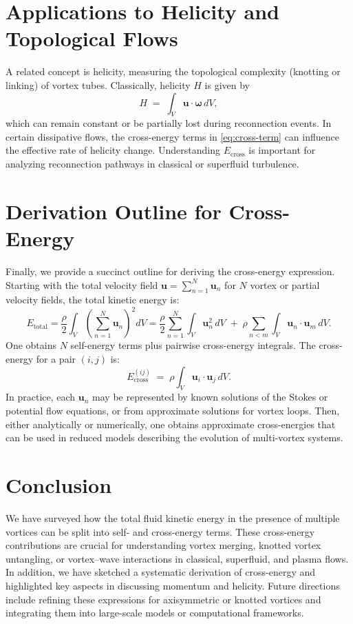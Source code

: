 \documentclass[11pt]{article}
\begin{document}
\section{Applications to Helicity and Topological Flows}
\label{sec:helicity}
A related concept is helicity, measuring the topological complexity (knotting or
linking) of vortex tubes. Classically, helicity $H$ is given by
\begin{equation}
   H \;=\; \int_V \mathbf{u} \cdot \boldsymbol{\omega}\, dV,
\end{equation}
which can remain constant or be partially lost during reconnection events. In certain
dissipative flows, the cross-energy terms in \eqref{eq:cross-term} can influence
the effective rate of helicity change. Understanding $E_{\text{cross}}$ is important
for analyzing reconnection pathways in classical or superfluid turbulence.

\section{Derivation Outline for Cross-Energy}
\label{sec:derivation}
Finally, we provide a succinct outline for deriving the cross-energy expression.
Starting with the total velocity field $\mathbf{u} = \sum_{n=1}^N \mathbf{u}_n$
for $N$ vortex or partial velocity fields, the total kinetic energy is:
\begin{equation}
   E_{\text{total}}
   = \frac{\rho}{2} \int_V \left(\sum_{n=1}^N \mathbf{u}_n \right)^2 dV
   = \frac{\rho}{2} \sum_{n=1}^N \int_V \mathbf{u}_n^2 \, dV
      \;+\;\rho \sum_{n<m} \int_V \mathbf{u}_n \cdot \mathbf{u}_m \, dV.
\end{equation}
One obtains $N$ self-energy terms plus pairwise cross-energy integrals.
The cross-energy for a pair $(i,j)$ is:
\begin{equation}
   E_{\text{cross}}^{(ij)} \;=\; \rho \int_V \mathbf{u}_i \cdot \mathbf{u}_j \, dV.
\end{equation}
In practice, each $\mathbf{u}_n$ may be represented by known solutions of the
Stokes or potential flow equations, or from approximate solutions for vortex loops.
Then, either analytically or numerically, one obtains approximate cross-energies
that can be used in reduced models describing the evolution of multi-vortex
systems.

\section*{Conclusion}
We have surveyed how the total fluid kinetic energy in the presence of multiple
vortices can be split into self- and cross-energy terms. These cross-energy
contributions are crucial for understanding vortex merging, knotted vortex
untangling, or vortex–wave interactions in classical, superfluid, and plasma
flows. In addition, we have sketched a systematic derivation of cross-energy and
highlighted key aspects in discussing momentum and helicity. Future directions
include refining these expressions for axisymmetric or knotted vortices and
integrating them into large-scale models or computational frameworks.
\end{document}
